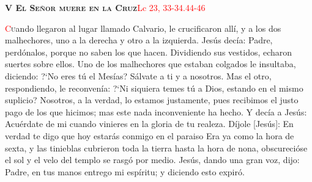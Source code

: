 \noindent\textbf{\textsc{V El Señor muere en la Cruz}}\hfill\textcolor{red}{Lc 23, 33-34.44-46}

\vspace{0.25em}

\lettrine[lines=2]{\textcolor{red}{C}}uando llegaron al lugar llamado Calvario, le crucificaron allí, y a los dos malhechores, uno a la derecha y otro a la izquierda. 
Jesús decía: Padre, perdónalos, porque no saben los que hacen. Dividiendo sus vestidos, echaron suertes sobre ellos. Uno de los malhechores que estaban colgados le 
insultaba, diciendo: {?`}No eres tú el Mesías? Sálvate a ti y a nosotros. Mas el otro, respondiendo, le reconvenía: {?`}Ni siquiera temes tú a Dios, estando en el 
mismo suplicio? Nosotros, a la verdad, lo estamos justamente, pues recibimos el justo pago de los que hicimos; mas este nada inconveniente ha hecho. Y decía a Jesús: 
Acuérdate de mi cuando vinieres en la gloria de tu realeza. Díjole [Jesús]: En verdad te digo que hoy estarás conmigo en el paraiso Era ya como la hora de sexta,
y las tinieblas cubrieron toda la tierra hasta la hora de nona, obscurecióse el sol y el velo del templo se rasgó por medio. Jesús, dando una gran voz, dijo: Padre, 
en tus manos entrego mi espíritu; y diciendo esto expiró.
